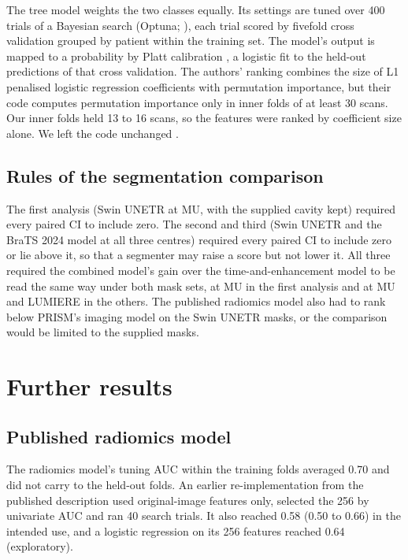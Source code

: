 \documentclass[11pt,a4paper]{article}
\begin{document}
The tree model weights the two classes equally. Its settings are tuned over 400 trials of a Bayesian search (Optuna; \citealp{akiba2019}),
each trial scored by fivefold cross validation grouped by patient within the training set. The model's output is
mapped to a probability by Platt calibration \citep{platt1999}, a logistic fit to the held-out predictions of that cross validation.
The authors' ranking combines the size of L1 penalised logistic regression coefficients with permutation importance,
but their code computes permutation importance only in inner folds of at least 30 scans. Our inner folds held 13 to 16
scans, so the features were ranked by coefficient size alone. We left the code unchanged
\citep{christodoulou2026}.

\subsection{Rules of the segmentation comparison}\label{sec:S30.4}

The first analysis (Swin UNETR at MU, with the supplied cavity kept) required every paired CI to include zero. The
second and third (Swin UNETR and the BraTS 2024 model at all three centres) required every paired CI to include zero
or lie above it, so that a segmenter may raise a score but not lower it. All three required the combined model's gain
over the time-and-enhancement model to be read the same way under both mask sets, at MU in the first analysis and at
MU and LUMIERE in the others. The published radiomics model also had to rank below PRISM's imaging model on the Swin UNETR
masks, or the comparison would be limited to the supplied masks.

\FloatBarrier
\section{Further results}\label{sec:S31}

\subsection{Published radiomics model}\label{sec:S31.1}

The radiomics model's tuning AUC within the training folds averaged 0.70 and did not carry to the held-out folds. An earlier
re-implementation from the published description used original-image features only, selected the 256 by univariate
AUC and ran 40 search trials. It also reached 0.58 (0.50 to 0.66) in the intended use, and a logistic regression on
its 256 features reached 0.64 (exploratory).
\end{document}
